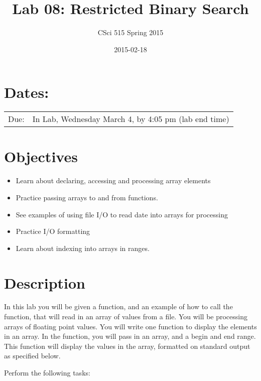 \documentclass[11pt]{article}
\title{Lab 08: Restricted Binary Search}
\author{CSci 515 Spring 2015}
\date{2015-02-18}
\begin{document}
\maketitle


\section*{Dates:}
\label{sec-1}


\begin{center}
\begin{tabular}{ll}
 Due:  &  In Lab, Wednesday March 4, by 4:05 pm (lab end time)  \\
\end{tabular}
\end{center}
\section*{Objectives}
\label{sec-2}

\begin{itemize}
\item Learn about declaring, accessing and processing array elements
\item Practice passing arrays to and from functions.
\item See examples of using file I/O to read date into arrays for processing
\item Practice I/O formatting
\item Learn about indexing into arrays in ranges.
\end{itemize}
\section*{Description}
\label{sec-3}

In this lab you will be given a function, and an example of how to
call the function, that will read in an array of values from a
file. You will be processing arrays of floating point values.  You
will write one function to display the elements in an array.  In the
function, you will pass in an array, and a begin and end range.  This
function will display the values in the array, formatted on standard
output as specified below.

Perform the following tasks:
\end{document}
